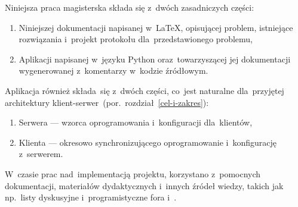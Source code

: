 \documentclass[thesis]{subfiles}
\begin{document}
\noindent Niniejsza praca magisterska składa się z~dwóch zasadniczych części:
\begin{enumerate}
	\item Niniejszej dokumentacji napisanej w~\LaTeX, opisującej problem, istniejące rozwiązania i~projekt protokołu dla~przedstawionego problemu,
	\item Aplikacji napisanej w~języku Python oraz~towarzyszącej jej dokumentacji wygenerowanej z~komentarzy w~kodzie źródłowym.
\end{enumerate}
Aplikacja również składa~się z~dwóch części, co~jest naturalne dla~przyjętej architektury klient-serwer~(por.~rozdział~\ref{cel-i-zakres}):
\begin{enumerate}
	\item Serwera --- wzorca oprogramowania i~konfiguracji dla~klientów,
	\item Klienta --- okresowo synchronizującego oprogramowanie i~konfigurację z~serwerem.
\end{enumerate}

W~czasie prac nad~implementacją projektu, korzystano z~pomocnych dokumentacji, materiałów dydaktycznych i~innych źródeł wiedzy, takich jak np.~listy dyskusyjne i~programistyczne fora  i~.
\end{document}
